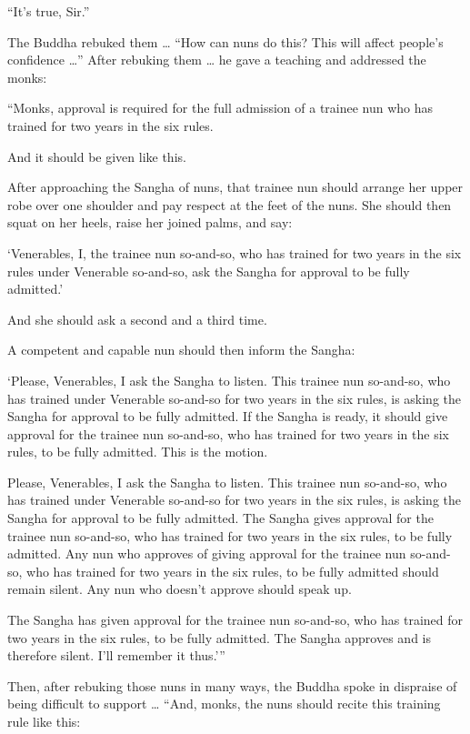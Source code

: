 \documentclass[12pt,openany]{book}%
\begin{document}
“It’s true, Sir.” 

The Buddha rebuked them … “How can nuns do this? This will affect people’s confidence …” After rebuking them … he gave a teaching and addressed the monks: 

“Monks, approval is required for the full admission of a trainee nun who has trained for two years in the six rules. 

And it should be given like this. 

After approaching the Sangha of nuns, that trainee nun should arrange her upper robe over one shoulder and pay respect at the feet of the nuns. She should then squat on her heels, raise her joined palms, and say: 

‘Venerables, I, the trainee nun so-and-so, who has trained for two years in the six rules under Venerable so-and-so, ask the Sangha for approval to be fully admitted.’ 

And she should ask a second and a third time. 

A competent and capable nun should then inform the Sangha: 

‘Please, Venerables, I ask the Sangha to listen. This trainee nun so-and-so, who has trained under Venerable so-and-so for two years in the six rules, is asking the Sangha for approval to be fully admitted. If the Sangha is ready, it should give approval for the trainee nun so-and-so, who has trained for two years in the six rules, to be fully admitted. This is the motion. 

Please, Venerables, I ask the Sangha to listen. This trainee nun so-and-so, who has trained under Venerable so-and-so for two years in the six rules, is asking the Sangha for approval to be fully admitted. The Sangha gives approval for the trainee nun so-and-so, who has trained for two years in the six rules, to be fully admitted. Any nun who approves of giving approval for the trainee nun so-and-so, who has trained for two years in the six rules, to be fully admitted should remain silent. Any nun who doesn’t approve should speak up. 

The Sangha has given approval for the trainee nun so-and-so, who has trained for two years in the six rules, to be fully admitted. The Sangha approves and is therefore silent. I’ll remember it thus.’” 

Then, after rebuking those nuns in many ways, the Buddha spoke in dispraise of being difficult to support … “And, monks, the nuns should recite this training rule like this: 
\end{document}
